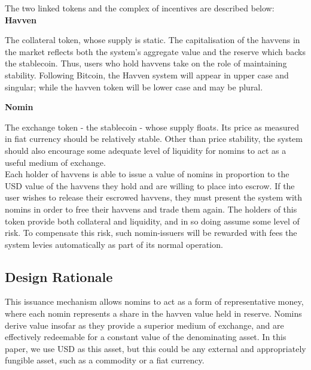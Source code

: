\noindent The two linked tokens and the complex of incentives are described below: \\

\noindent \textbf{Havven}

\vspace{1mm}

\noindent The collateral token, whose supply is static.
The capitalisation of the havvens in the market reflects both the system's aggregate value and the reserve
which backs the stablecoin. Thus, users who hold havvens take on the role of maintaining stability.
Following Bitcoin, the Havven system will appear in upper case and singular; while the havven
token will be lower case and may be plural.

\vspace{2mm}

\noindent \textbf{Nomin}

\vspace{1mm}

\noindent The exchange token - the stablecoin - whose supply floats.
Its price as measured in fiat currency should be relatively stable.
Other than price stability, the system should also encourage some adequate level
of liquidity for nomins to act as a useful medium of exchange. \\

\noindent Each holder of havvens is able to issue a value of nomins in proportion to the USD value
of the havvens they hold and are willing to place into escrow. If the user wishes to release their escrowed havvens, they must
present the system with nomins in order to free their havvens and trade them again.
The holders of this token provide both collateral and liquidity, and in so doing assume some
level of risk. To compensate this risk, such nomin-issuers will be rewarded with fees the system levies
automatically as part of its normal operation. \\

\subsection{Design Rationale}

\noindent This issuance mechanism allows nomins to act as a form of representative money, where each nomin represents a share in the havven value held in reserve. Nomins derive value insofar as they provide a superior medium of exchange, and are effectively redeemable for a constant value of the denominating asset. In this paper, we use USD as this asset, but this could be any external and appropriately fungible asset, such as a commodity or a fiat currency. \\


